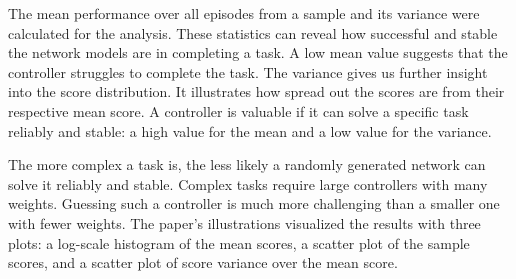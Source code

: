 The mean performance over all episodes from a sample and its variance were calculated for the analysis. These statistics can reveal how successful and stable the network models are in completing a task. A low mean value suggests that the controller struggles to complete the task. The variance gives us further insight into the score distribution. It illustrates how spread out the scores are from their respective mean score. A controller is valuable if it can solve a specific task reliably and stable: a high value for the mean and a low value for the variance.

The more complex a task is, the less likely a randomly generated network can solve it reliably and stable. Complex tasks require large controllers with many weights. Guessing such a controller is much more challenging than a smaller one with fewer weights. The paper's illustrations visualized the results with three plots: a log-scale histogram of the mean scores, a scatter plot of the sample scores, and a scatter plot of score variance over the mean score.


